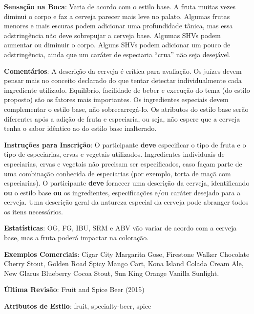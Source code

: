 \textbf{Sensação na Boca}: Varia de acordo com o estilo base. A fruta muitas vezes diminui o corpo e faz a cerveja parecer mais leve no palato. Algumas frutas menores e mais escuras podem adicionar uma profundidade tânica, mas essa adstringência não deve sobrepujar a cerveja base. Algumas SHVs podem aumentar ou diminuir o corpo. Alguns SHVs podem adicionar um pouco de adstringência, ainda que um caráter de especiaria “crua” não seja desejável.

\textbf{Comentários}: A descrição da cerveja é crítica para avaliação. Os juízes devem pensar mais no conceito declarado do que tentar detectar individualmente cada ingrediente utilizado. Equilíbrio, facilidade de beber e execução do tema (do estilo proposto) são os fatores mais importantes. Os ingredientes especiais devem complementar o estilo base, não sobrecarregá-lo. Os atributos do estilo base serão diferentes após a adição de fruta e especiaria, ou seja, não espere que a cerveja tenha o sabor idêntico ao do estilo base inalterado.

\textbf{Instruções para Inscrição}: O participante \textbf{deve} especificar o tipo de fruta e o tipo de especiarias, ervas e vegetais utilizados. Ingredientes individuais de especiarias, ervas e vegetais não precisam ser especificados, caso façam parte de uma combinação conhecida de especiarias (por exemplo, torta de maçã com especiarias). O participante \textbf{deve} fornecer uma descrição da cerveja, identificando \textbf{ou} o estilo base \textbf{ou} os ingredientes, especificações e/ou caráter desejado para a cerveja. Uma descrição geral da natureza especial da cerveja pode abranger todos os itens necessários.

\textbf{Estatísticas}: OG, FG, IBU, SRM e ABV vão variar de acordo com a cerveja base, mas a fruta poderá impactar na coloração.

\textbf{Exemplos Comerciais}: Cigar City Margarita Gose, Firestone Walker Chocolate Cherry Stout, Golden Road Spicy Mango Cart, Kona Island Colada Cream Ale, New Glarus Blueberry Cocoa Stout, Sun King Orange Vanilla Sunlight.

\textbf{Última Revisão}: Fruit and Spice Beer (2015)

\textbf{Atributos de Estilo}: fruit, specialty-beer, spice
